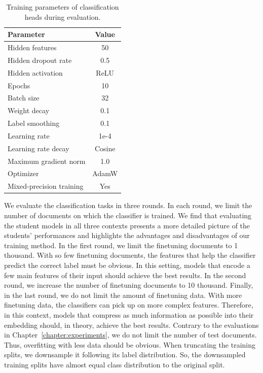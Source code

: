\begin{table}
  \footnotesize
  \centering

  \begin{tabular}{l c}
    \toprule
    Parameter & Value \\
    \midrule
    Hidden features & 50 \\
    Hidden dropout rate & 0.5 \\
    Hidden activation & ReLU \\
    Epochs & 10 \\
    Batch size & 32 \\
    Weight decay & 0.1 \\
    Label smoothing & 0.1 \\
    Learning rate & 1e-4 \\
    Learning rate decay & Cosine \\
    Maximum gradient norm & 1.0 \\
    Optimizer & AdamW \\
    Mixed-precision training & Yes \\
    \bottomrule
  \end{tabular}

  \caption{Training parameters of classification heads during evaluation.}

  \label{table:head_train_eval_params}

\end{table}

We evaluate the classification tasks in three rounds. In each round, we limit
the number of documents on which the classifier is trained. We find that evaluating the student models in all three contexts presents a more detailed picture of
the students' performances and highlights the advantages and disadvantages
of our training method. In the first round, we limit the finetuning
documents to 1 thousand. With so few finetuning documents, the features that
help the classifier predict the correct label must be obvious. In
this setting, models that encode a few main features of their input should
achieve the best results. In the second round, we increase the number of
finetuning documents to 10 thousand. Finally, in the last round, we do not limit
the amount of finetuning data. With more finetuning data, the
classifiers can pick up on more complex features. Therefore, in this context,
models that compress as much information as possible into their embedding
should, in theory, achieve the best results. Contrary to the
evaluations in Chapter~\ref{chapter:experiments}, we do not limit the number of
test documents. Thus, overfitting with less data should be obvious. When
truncating the training splits, we downsample it following its label
distribution. So, the downsampled training splits have almost equal class
distribution to the original split.

